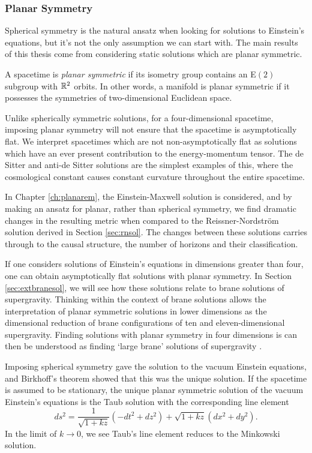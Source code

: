 \subsubsection{Planar Symmetry}

Spherical symmetry is the natural ansatz when looking for solutions to Einstein's equations, but it's not the only assumption we can start with. The main results of this thesis come from considering static solutions which are planar symmetric.

\begin{defn}
A spacetime is \emph{planar symmetric} if its isometry group contains an E$(2)$ subgroup with ${\mathbb{R}}^2$ orbits. In other words, a manifold is planar symmetric if it possesses the symmetries of two-dimensional Euclidean space.
\end{defn}

Unlike spherically symmetric solutions, for a four-dimensional spacetime, imposing planar symmetry will not ensure that the spacetime is asymptotically flat. We interpret spacetimes which are not non-asymptotically flat as solutions which have an ever present contribution to the energy-momentum tensor. The de Sitter and anti-de Sitter solutions are the simplest examples of this, where the cosmological constant causes constant curvature throughout the entire spacetime. 

In Chapter \ref{ch:planarem}, the Einstein-Maxwell solution is considered, and by making an ansatz for planar, rather than spherical symmetry, we find dramatic changes in the resulting metric when compared to the Reissner-Nordstr\"om solution derived in Section \ref{sec:rnsol}. The changes between these solutions carries through to the causal structure, the number of horizons and their classification.

If one considers solutions of Einstein's equations in dimensions greater than four, one can obtain asymptotically flat solutions with planar symmetry. In Section \ref{sec:extbranesol}, we will see how these solutions relate to brane solutions of supergravity. Thinking within the context of brane solutions allows the interpretation of planar symmetric solutions in lower dimensions as the dimensional reduction of brane configurations of ten and eleven-dimensional supergravity. Finding solutions with planar symmetry in four dimensions is can then be understood as finding `large brane' solutions of supergravity \cite{Mohaupt:2000gc}.

Imposing spherical symmetry gave the \sch solution to the vacuum Einstein equations, and Birkhoff's theorem showed that this was the unique solution. If the spacetime is assumed to be stationary, the unique planar symmetric solution of the vacuum Einstein's equations is the Taub solution with the corresponding line element \cite{Taub:1951}
\begin{equation*}
	ds^2 = \frac{1}{\sqrt{1 + k z}} \left(-dt^2 + dz^2 \right) + \sqrt{1 + k z} (dx^2 + dy^2).
\end{equation*}
In the limit of $k \rightarrow 0$, we see Taub's line element reduces to the Minkowski solution.  

